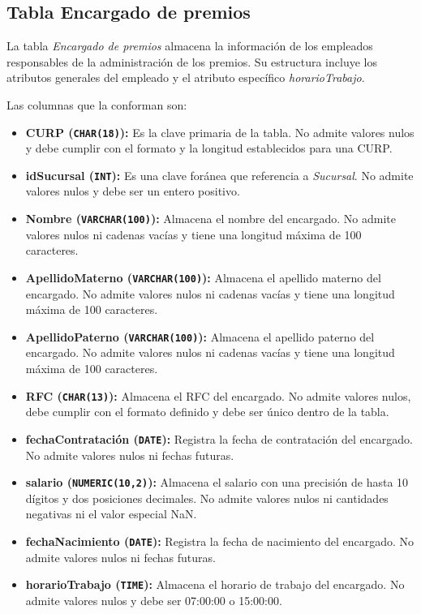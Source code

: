 \subsection{Tabla Encargado de premios}

La tabla \textit{Encargado de premios} almacena la información de los empleados responsables de la administración de los premios. Su estructura incluye los atributos generales del empleado y el atributo específico \textit{horarioTrabajo}.

Las columnas que la conforman son:

\begin{itemize}
    \item \textbf{CURP (\texttt{CHAR(18)}):} Es la clave primaria de la tabla. No admite valores nulos y debe cumplir con el formato y la longitud establecidos para una CURP.

    \item \textbf{idSucursal (\texttt{INT}):} Es una clave foránea que referencia a \textit{Sucursal}. No admite valores nulos y debe ser un entero positivo.

    \item \textbf{Nombre (\texttt{VARCHAR(100)}):} Almacena el nombre del encargado. No admite valores nulos ni cadenas vacías y tiene una longitud máxima de 100 caracteres.

    \item \textbf{ApellidoMaterno (\texttt{VARCHAR(100)}):} Almacena el apellido materno del encargado. No admite valores nulos ni cadenas vacías y tiene una longitud máxima de 100 caracteres.

    \item \textbf{ApellidoPaterno (\texttt{VARCHAR(100)}):} Almacena el apellido paterno del encargado. No admite valores nulos ni cadenas vacías y tiene una longitud máxima de 100 caracteres.

    \item \textbf{RFC (\texttt{CHAR(13)}):} Almacena el RFC del encargado. No admite valores nulos, debe cumplir con el formato definido y debe ser único dentro de la tabla.

    \item \textbf{fechaContratación (\texttt{DATE}):} Registra la fecha de contratación del encargado. No admite valores nulos ni fechas futuras.

    \item \textbf{salario (\texttt{NUMERIC(10,2)}):} Almacena el salario con una precisión de hasta 10 dígitos y dos posiciones decimales. No admite valores nulos ni cantidades negativas ni el valor especial NaN.

    \item \textbf{fechaNacimiento (\texttt{DATE}):} Registra la fecha de nacimiento del encargado. No admite valores nulos ni fechas futuras.

    \item \textbf{horarioTrabajo (\texttt{TIME}):} Almacena el horario de trabajo del encargado. No admite valores nulos y debe ser 07:00:00 o 15:00:00.
\end{itemize}


